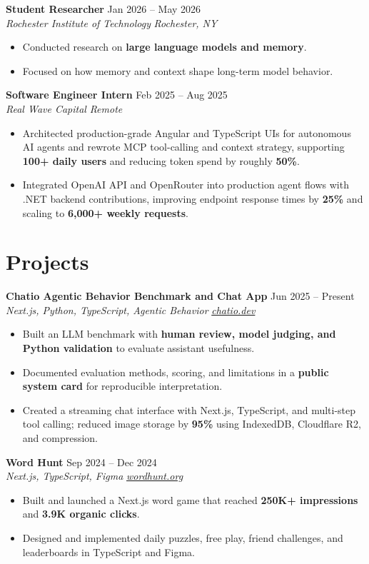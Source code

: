 \documentclass[10pt,letterpaper]{article}
\newif\ifresumeFirstRole
\newcommand{\resumeRole}[4]{%
  \ifresumeFirstRole
    \global\resumeFirstRolefalse
  \else
    \vspace{0pt plus 1fill}%
  \fi
  \textbf{#1} \hfill #2\\
  \textit{#3} \hfill \textit{#4}
}
\begin{document}
\resumeRole{Student Researcher}{Jan 2026 -- May 2026}{Rochester Institute of Technology}{Rochester, NY}
\begin{itemize}
  \item Conducted research on \textbf{large language models and memory}.
  \item Focused on how memory and context shape long-term model behavior.
\end{itemize}

\resumeRole{Software Engineer Intern}{Feb 2025 -- Aug 2025}{Real Wave Capital}{Remote}
\begin{itemize}
  \item Architected production-grade Angular and TypeScript UIs for autonomous AI agents and rewrote MCP tool-calling and context strategy, supporting \textbf{100+ daily users} and reducing token spend by roughly \textbf{50\%}.
  \item Integrated OpenAI API and OpenRouter into production agent flows with .NET backend contributions, improving endpoint response times by \textbf{25\%} and scaling to \textbf{6,000+ weekly requests}.
\end{itemize}

\section*{Projects}
\resumeRole{Chatio Agentic Behavior Benchmark and Chat App}{Jun 2025 -- Present}{Next.js, Python, TypeScript, Agentic Behavior}{\href{https://chatio.dev}{chatio.dev}}
\begin{itemize}
  \item Built an LLM benchmark with \textbf{human review, model judging, and Python validation} to evaluate assistant usefulness.
  \item Documented evaluation methods, scoring, and limitations in a \textbf{public system card} for reproducible interpretation.
  \item Created a streaming chat interface with Next.js, TypeScript, and multi-step tool calling; reduced image storage by \textbf{95\%} using IndexedDB, Cloudflare R2, and compression.
\end{itemize}

\resumeRole{Word Hunt}{Sep 2024 -- Dec 2024}{Next.js, TypeScript, Figma}{\href{https://wordhunt.org}{wordhunt.org}}
\begin{itemize}
  \item Built and launched a Next.js word game that reached \textbf{250K+ impressions} and \textbf{3.9K organic clicks}.
  \item Designed and implemented daily puzzles, free play, friend challenges, and leaderboards in TypeScript and Figma.
\end{itemize}
\end{document}
